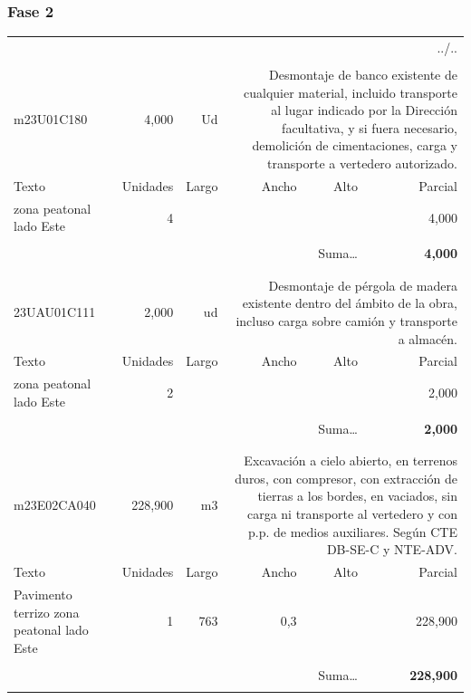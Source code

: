 \documentclass{book}%
\begin{document}
\subsubsection{Fase 2}%
\begin{longtable}{lrrrrr}%
\multicolumn{6}{r}{../..}\\%
\endfoot%
\endlastfoot%
&&&&&\\%
m23U01C180&     4,000& Ud&\multicolumn{3}{p{6cm}}{\scriptsize Desmontaje de banco existente de cualquier material, incluido transporte al lugar indicado por la Dirección facultativa, y si fuera necesario, demolición de cimentaciones, carga y transporte a vertedero autorizado.\normalsize}\\%
Texto&Unidades&Largo&Ancho&Alto&Parcial\\%
\hline%
\multicolumn{1}{p{3.5cm}}{ zona peatonal lado Este}&4&&&&     4,000\\%
&&&&&\\%
\multicolumn{5}{r}{Suma\ldots}&\textbf{     4,000}\\%
\hline%
&&&&&\\%
&&&&&\\%
23UAU01C111&     2,000& ud&\multicolumn{3}{p{6cm}}{\scriptsize Desmontaje de pérgola de madera existente dentro del ámbito de la obra, incluso carga sobre camión y transporte a almacén.\normalsize}\\%
Texto&Unidades&Largo&Ancho&Alto&Parcial\\%
\hline%
\multicolumn{1}{p{3.5cm}}{ zona peatonal lado Este}&2&&&&     2,000\\%
&&&&&\\%
\multicolumn{5}{r}{Suma\ldots}&\textbf{     2,000}\\%
\hline%
&&&&&\\%
&&&&&\\%
m23E02CA040&   228,900& m3&\multicolumn{3}{p{6cm}}{\scriptsize Excavación a cielo abierto, en terrenos duros, con compresor, con extracción de tierras a los bordes, en vaciados, sin carga ni transporte al vertedero y con p.p. de medios auxiliares. Según CTE DB-SE-C y NTE-ADV.\normalsize}\\%
Texto&Unidades&Largo&Ancho&Alto&Parcial\\%
\hline%
\multicolumn{1}{p{3.5cm}}{Pavimento terrizo zona peatonal lado Este}&1&763&0,3&&   228,900\\%
&&&&&\\%
\multicolumn{5}{r}{Suma\ldots}&\textbf{   228,900}\\%
\hline%
&&&&&\\%
\end{longtable}%
\newpage
\end{document}
